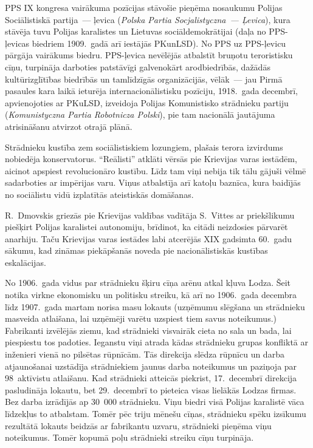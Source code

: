 \documentclass[twoside,a5paper,12pt,fleqn,openany]{extbook}
\newcommand{\pltxti}[1]{\textit{\textpolish{#1}}}
\begin{document}
PPS IX kongresa vairākuma pozīcijas stāvošie pieņēma nosaukumu Polijas Sociālistiskā partija~--- ļevica (\pltxti{Polska Partia Socjalistyczna~--- Ļevica}), kura stāvēja tuvu Polijas karalistes un Lietuvas sociāldemokrātijai (daļa no PPS-ļevicas biedriem 1909.~gadā arī iestājās PKunLSD). No PPS uz PPS-ļevicu pārgāja vairākums biedru. PPS-ļevica nevēlējās atbalstīt bruņotu teroristisku cīņu, turpināja darboties patstāvīgi galvenokārt arodbiedrībās, dažādās kultūrizglītības biedrībās un tamlīdzīgās organizācijās, vēlāk~--- jau Pirmā pasaules kara laikā ieturēja internacionālistisku pozīciju, 1918.~gada decembrī, apvienojoties ar PKuLSD, izveidoja Polijas Komunistisko strādnieku partiju (\pltxti{Komunistyczna Partia Robotnicza Polski}), pie tam nacionālā jautājuma atrisināšanu atvirzot otrajā plānā.

Strādnieku kustība zem sociālistiskiem lozungiem, plašais terora izvirdums nobiedēja konservatorus. ``Reālisti'' atklāti vērsās pie Krievijas varas iestādēm, aicinot apspiest revolucionāro kustību. Līdz tam viņi nebija tik tālu gājuši vēlmē sadarboties ar impērijas varu. Viņus atbalstīja arī katoļu baznīca, kura baidījās no sociālistu vidū izplatītās ateistiskās domāšanas.

R.~Dmovskis griezās pie Krievijas valdības vadītāja S.~Vittes ar priekšlikumu piešķirt Polijas karalistei autonomiju, brīdinot, ka citādi neizdosies pārvarēt anarhiju. Taču Krievijas varas iestādes labi atcerējās XIX gadsimta 60.~gadu sākumu, kad zināmas piekāpšanās noveda pie nacionālistiskās kustības eskalācijas.

No 1906.~gada vidus par strādnieku šķiru cīņa arēnu atkal kļuva Lodza. Šeit notika virkne ekonomisku un politisku streiku, kā arī no 1906.~gada decembra līdz 1907.~gada martam norisa masu lokauts (uzņēmumu slēgšana un strādnieku masveida atlaišana, lai uzņēmēji varētu uzspiest tiem savus noteikumus.) Fabrikanti izvēlējās ziemu, kad strādnieki visvairāk cieta no sala un bada, lai piespiestu tos padoties. Ieganstu viņi atrada kādas strādnieku grupas konfliktā ar inženieri vienā no pilsētas rūpnīcām. Tās direkcija slēdza rūpnīcu un darba atjaunošanai uzstādīja strādniekiem jaunus darba noteikumus un paziņoja par 98~aktīvistu atlaišanu. Kad strādnieki atteicās piekrist, 17.~decembrī direkcija pasludināja lokautu, bet 29.~decembrī to pieteica visas lielākās Lodzas firmas. Bez darba izrādījās ap 30~000 strādnieku. Viņu biedri visā Polijas karalistē vāca līdzekļus to atbalstam. Tomēr pēc triju mēnešu cīņas, strādnieku spēku izsīkumu rezultātā lokauts beidzās ar fabrikantu uzvaru, strādnieki pieņēma viņu noteikumus. Tomēr kopumā poļu strādnieki streiku cīņu turpināja.
\end{document}

